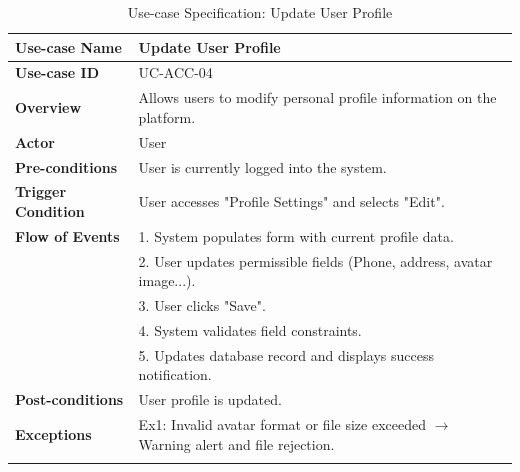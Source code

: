 \newpage
\begin{longtable}{|p{3.5cm}|p{11.5cm}|}
    \hline
    \textbf{Use-case Name} & \textbf{Update User Profile} \\
    \hline
    \textbf{Use-case ID} & UC-ACC-04 \\
    \hline
    \textbf{Overview} & Allows users to modify personal profile information on the platform. \\
    \hline
    \textbf{Actor} & User \\
    \hline
    \textbf{Pre-conditions} & User is currently logged into the system. \\
    \hline
    \textbf{Trigger Condition} & User accesses "Profile Settings" and selects "Edit". \\
    \hline
    \textbf{Flow of Events} & 
    1. System populates form with current profile data.\\ 
 & 
    2. User updates permissible fields (Phone, address, avatar image...).\\ 
 & 
    3. User clicks "Save".\\ 
 & 
    4. System validates field constraints.\\ 
 & 
    5. Updates database record and displays success notification. \\
    \hline
    \textbf{Post-conditions} & User profile is updated. \\
    \hline
    \textbf{Exceptions} & 
    Ex1: Invalid avatar format or file size exceeded $\rightarrow$ Warning alert and file rejection. \\
    \hline
    \caption{Use-case Specification: Update User Profile} \\
\end{longtable}

